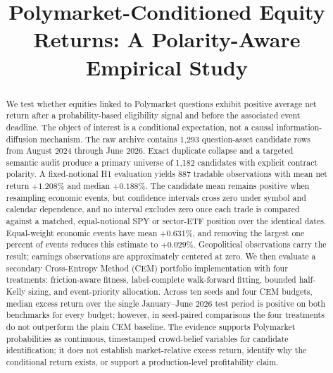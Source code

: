 \documentclass[sigconf,anonymous]{acmart}
\begin{document}
\title{Polymarket-Conditioned Equity Returns: A Polarity-Aware Empirical Study}

\begin{abstract}
We test whether equities linked to Polymarket questions exhibit positive average net return after a probability-based eligibility signal and before the associated event deadline. The object of interest is a conditional expectation, not a causal information-diffusion mechanism. The raw archive contains 1,293 question-asset candidate rows from August 2024 through June 2026. Exact duplicate collapse and a targeted semantic audit produce a primary universe of 1,182 candidates with explicit contract polarity. A fixed-notional H1 evaluation yields 887 tradable observations with mean net return $+1.208\%$ and median $+0.188\%$. The candidate mean remains positive when resampling economic events, but confidence intervals cross zero under symbol and calendar dependence, and no interval excludes zero once each trade is compared against a matched, equal-notional SPY or sector-ETF position over the identical dates. Equal-weight economic events have mean $+0.631\%$, and removing the largest one percent of events reduces this estimate to $+0.029\%$. Geopolitical observations carry the result; earnings observations are approximately centered at zero. We then evaluate a secondary Cross-Entropy Method (CEM) portfolio implementation with four treatments: friction-aware fitness, label-complete walk-forward fitting, bounded half-Kelly sizing, and event-priority allocation. Across ten seeds and four CEM budgets, median excess return over the single January--June 2026 test period is positive on both benchmarks for every budget; however, in seed-paired comparisons the four treatments do not outperform the plain CEM baseline. The evidence supports Polymarket probabilities as continuous, timestamped crowd-belief variables for candidate identification; it does not establish market-relative excess return, identify why the conditional return exists, or support a production-level profitability claim.
\end{abstract}


\maketitle
\end{document}
